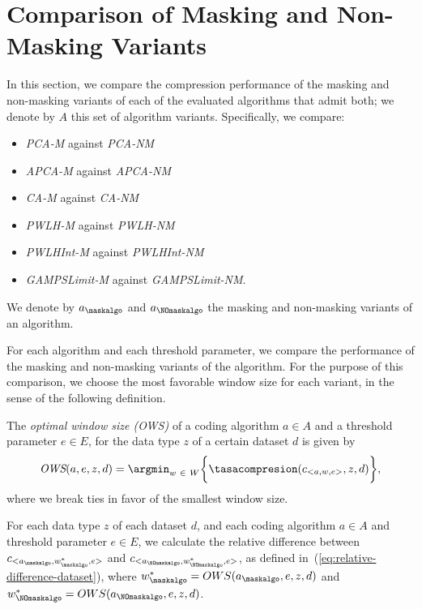 
\section{Comparison of Masking and Non-Masking Variants}
\label{secX:rendimiento-relativo}


In this section, we compare the compression performance of the masking and non-masking variants of each of the evaluated algorithms that admit both; we denote by $A$ this set of algorithm variants. Specifically, we compare:


\vspace{-5pt}
\begin{itemize}
    \item \textit{PCA-M} against \textit{PCA-NM}
    \item \textit{APCA-M} against \textit{APCA-NM}
    \item \textit{CA-M} against \textit{CA-NM}
    \item \textit{PWLH-M} against \textit{PWLH-NM}
    \item \textit{PWLHInt-M} against \textit{PWLHInt-NM} 
    \item \textit{GAMPSLimit-M} against \textit{GAMPSLimit-NM}.
\end{itemize}


\vspace{+3pt}
\begin{notation}
We denote by $a_\maskalgo$ and $a_\NOmaskalgo$ the masking and non-masking variants of an algorithm.
\end{notation}


For each algorithm and each threshold parameter, we compare the performance of the masking and non-masking variants of the algorithm. For the purpose of this comparison, we choose the most favorable window size for each variant, in the sense of the following definition.


\newcommand{\ows}{\textit{OWS}}
\begin{defcion}
The \textit{optimal window size (\ows)} of a coding algorithm $a \in A$ and a threshold parameter $e \in E$, for the data type $z$ of a certain dataset $d$ is given by
\begin{equation}
\label{eq:ows}
\ows(a, e, z, d) = \argmin_{w\ \in \ W} \biggl\{ \tasacompresion(c_{<a, w, e>}, z, d) \biggr\},
\end{equation}
where we break ties in favor of the smallest window size.
\end{defcion}


For each data type $z$ of each dataset $d$, and each coding algorithm $a \in A$ and threshold parameter $e \in E$, we calculate the relative difference between $c_{<a_\maskalgo, w_\maskalgo^{*}, e>}$ and $c_{<a_\NOmaskalgo, w_\NOmaskalgo^{*}, e>}$, as defined in~(\ref{eq:relative-difference-dataset}), where $w_\maskalgo^{*}=OWS(a_\maskalgo, e, z, d)$ and $w_\NOmaskalgo^{*}=OWS(a_\NOmaskalgo, e, z, d)$.


